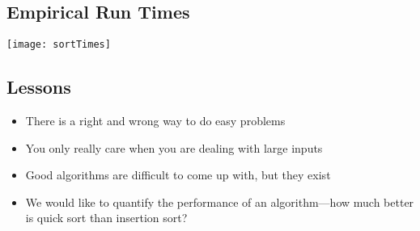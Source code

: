 
\begin{slide}
\section{Empirical Run Times}

\begin{center}
  \texttt{[image: sortTimes]}
\end{center}

\end{slide}


\begin{slide}
\section{Lessons}

\begin{PauseHighLight}
  \begin{itemize}
  \item There is a right and wrong way to do easy problems\pause
  \item You only really care when you are dealing with large inputs\pause
  \item Good algorithms are difficult to come up with, but they
    exist\pause
  \item We would like to quantify the performance of an
    algorithm\pause---how much better is quick sort than insertion
    sort?\pause
  \end{itemize}
\end{PauseHighLight}

\end{slide}


\Outline


